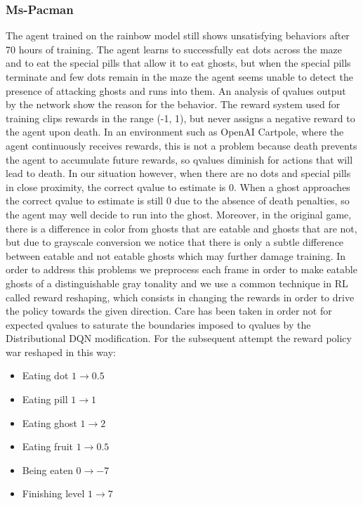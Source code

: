\documentclass[10pt,twocolumn,letterpaper]{article}
\begin{document}
\subsubsection{Ms-Pacman}
The agent trained on the rainbow model still shows unsatisfying behaviors after 70 hours of training. The agent learns to successfully eat dots across the maze and to eat the special pills that allow it to eat ghosts, but when the special pills terminate and few dots remain in the maze the agent seems unable to detect the presence of attacking ghosts and runs into them.
An analysis of qvalues output by the network show the reason for the behavior. The reward system used for training clips rewards in the range (-1, 1), but never assigns a negative reward to the agent upon death. In an environment such as OpenAI Cartpole, where the agent continuously receives rewards, this is not a problem because death prevents the agent to accumulate future rewards, so qvalues diminish for actions that will lead to death. In our situation however, when there are no dots and special pills in close proximity, the correct qvalue to estimate is 0. When a ghost approaches the correct qvalue to estimate is still 0 due to the absence of death penalties, so the agent may well decide to run into the ghost. Moreover, in the original game, there is a difference in color from ghosts that are eatable and ghosts that are not, but due to grayscale conversion we notice that there is only a subtle difference between eatable and not eatable ghosts which may further damage training.
In order to address this problems we preprocess each frame in order to make eatable ghosts of a distinguishable gray tonality and we use a common technique in RL called reward reshaping, which consists in changing the rewards in order to drive the policy towards the given direction.
Care has been taken in order not for expected qvalues to saturate the boundaries imposed to qvalues by the Distributional DQN modification. For the subsequent attempt the reward policy war reshaped in this way:
\begin{itemize}
	\item Eating dot $1 \rightarrow 0.5$
	\item Eating pill $1 \rightarrow 1$
	\item Eating ghost $1 \rightarrow 2$
	\item Eating fruit $1 \rightarrow 0.5$
	\item Being eaten $0 \rightarrow -7$
	\item Finishing level $1 \rightarrow 7$
\end{itemize}
\end{document}
